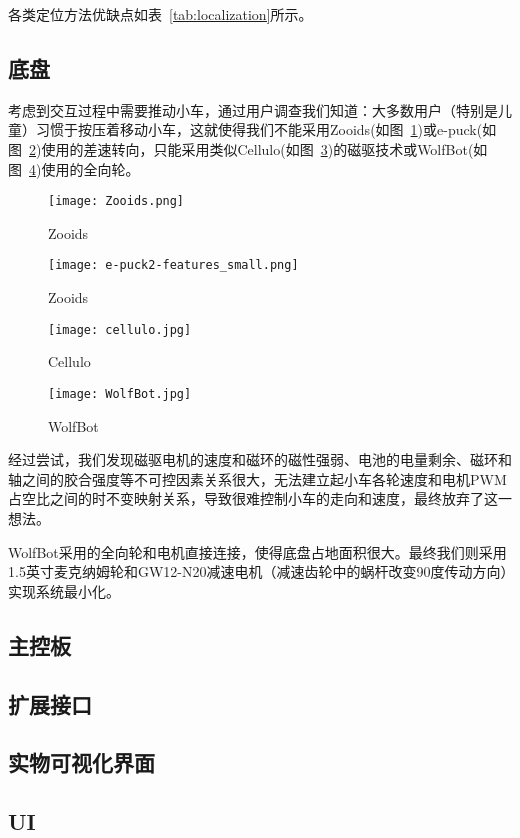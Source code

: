 
各类定位方法优缺点\cite{ozgur2018cellulo}如表~\ref{tab:localization}所示。

\subsection{底盘}
考虑到交互过程中需要推动小车，通过用户调查我们知道：大多数用户（特别是儿童）习惯于按压着移动小车，这就使得我们不能采用Zooids\cite{le2016zooids}(如图~\ref{fig:Zooids})或e-puck\cite{mondada2009puck}(如图~\ref{fig:e-puck})使用的差速转向，只能采用类似Cellulo\cite{ozgur2017cellulo}(如图~\ref{fig:Cellulo})的磁驱技术或WolfBot\cite{betthauser2014wolfbot}(如图~\ref{fig:WolfBot})使用的全向轮。

\begin{figure}[htbp]
    \centering
    \texttt{[image: Zooids.png]}
    \caption{Zooids}
    \label{fig:Zooids}
\end{figure}

\begin{figure}[htbp]
    \centering
    \texttt{[image: e-puck2-features\_small.png]}
    \caption{Zooids}
    \label{fig:e-puck}
\end{figure}

\begin{figure}[htbp]
    \centering
    \texttt{[image: cellulo.jpg]}
    \caption{Cellulo}
    \label{fig:Cellulo}
\end{figure}
  
\begin{figure}[htbp]
    \centering
    \texttt{[image: WolfBot.jpg]}
    \caption{WolfBot}
    \label{fig:WolfBot}
\end{figure}

经过尝试，我们发现磁驱电机的速度和磁环的磁性强弱、电池的电量剩余、磁环和轴之间的胶合强度等不可控因素关系很大，无法建立起小车各轮速度和电机PWM占空比之间的时不变映射关系，导致很难控制小车的走向和速度，最终放弃了这一想法。

WolfBot采用的全向轮和电机直接连接，使得底盘占地面积很大。最终我们则采用1.5英寸麦克纳姆轮和GW12-N20减速电机（减速齿轮中的蜗杆改变90度传动方向）实现系统最小化。

\subsection{主控板}

\subsection{扩展接口}

\subsection{实物可视化界面}

\subsection{UI}